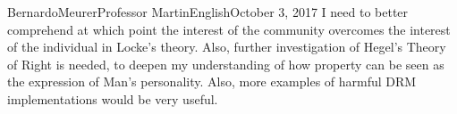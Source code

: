 \documentclass[12pt,letterpaper]{article}
\begin{document}
\begin{mla}{Bernardo}{Meurer}{Professor Martin}{English}{October 3, 2017}
        I need to better comprehend at which point the interest of the community overcomes the interest of the individual in Locke's theory. Also, further investigation of Hegel's Theory of Right is needed, to deepen my understanding of how property can be seen as the expression of Man's personality. Also, more examples of harmful DRM implementations would be very useful.
        \end{mla}
        
\end{document}
